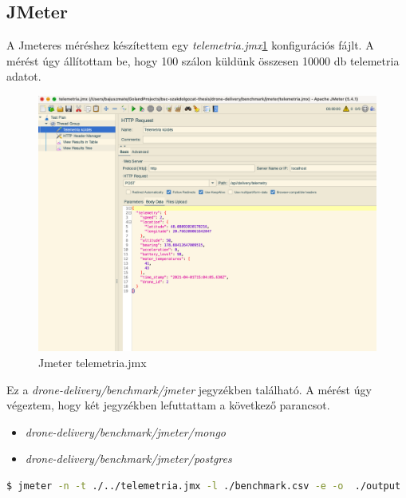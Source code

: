 \subsection{JMeter}
A Jmeteres méréshez készítettem egy \textit{telemetria.jmx}\ref{fig:jmeter-meres} konfigurációs fájlt.
A mérést úgy állítottam be, hogy 100 szálon küldünk összesen 10000 db telemetria adatot.
\begin{figure}[h]
    \centering
    \includegraphics[scale=0.3]{images/jmeter-meres}
    \caption{Jmeter telemetria.jmx}
    \label{fig:jmeter-meres}
\end{figure}
Ez a \textit{drone-delivery/benchmark/jmeter} jegyzékben található.
A mérést úgy végeztem, hogy két jegyzékben lefuttattam a következő parancsot.
\begin{itemize}
    \item \textit{drone-delivery/benchmark/jmeter/mongo}
    \item \textit{drone-delivery/benchmark/jmeter/postgres}
\end{itemize}
\begin{lstlisting}[language=bash]
  $ jmeter -n -t ./../telemetria.jmx -l ./benchmark.csv -e -o  ./output
\end{lstlisting}


